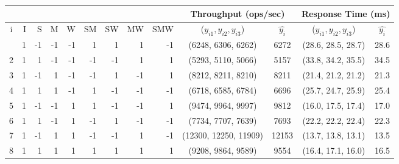 \begin{tabular}{|c|rrrrrrrr|c|c|c|c|}
       \cline{10-13}
       \multicolumn{9}{c}{} & \multicolumn{2}{|c}{\textbf{Throughput} (ops/sec)} & \multicolumn{2}{|c|}{\textbf{Response Time} (ms)}\TBstrut\\
       \hline
       i & \hphantom{-}I\hphantom{-} & \hphantom{-}S\hphantom{-} & \hphantom{-}M\hphantom{-} &\hphantom{-}W\hphantom{-} & SM & SW & MW & SMW & ($y_{i1}, y_{i2}, y_{i3}$) & $\hat{y_i}$  & ($y_{i1}, y_{i2}, y_{i3}$) & $\hat{y_i}$\TBstrut\\
       \hline
   \Tstrut 1 & 1\hphantom{-} & -1\hphantom{-} & -1\hphantom{-} & -1\hphantom{--} & 1\hphantom{--} & 1\hphantom{--} & 1\hphantom{--} & -1\hphantom{---} & (6248, 6306, 6262) & 6272 & (28.6, 28.5, 28.7) & 28.6 \\
   2 & 1\hphantom{-} & 1\hphantom{-} & -1\hphantom{-} & -1\hphantom{--} & -1\hphantom{--} & -1\hphantom{--} & 1\hphantom{--} & 1\hphantom{---} & (5293, 5110, 5066) & 5157 & (33.8, 34.2, 35.5) & 34.5 \\
   3 & 1\hphantom{-} & -1\hphantom{-} & 1\hphantom{-} & -1\hphantom{--} & -1\hphantom{--} & 1\hphantom{--} & -1\hphantom{--} & 1\hphantom{---} & (8212, 8211, 8210) & 8211 & (21.4, 21.2, 21.2) & 21.3 \\
   4 & 1\hphantom{-} & 1\hphantom{-} & 1\hphantom{-} & -1\hphantom{--} & 1\hphantom{--} & -1\hphantom{--} & -1\hphantom{--} & -1\hphantom{---} & (6718, 6585, 6784) & 6696 & (25.7, 24.7, 25.9) & 25.4 \\
   5 & 1\hphantom{-} & -1\hphantom{-} & -1\hphantom{-} & 1\hphantom{--} & 1\hphantom{--} & -1\hphantom{--} & -1\hphantom{--} & 1\hphantom{---} & (9474, 9964, 9997) & 9812 & (16.0, 17.5, 17.4) & 17.0 \\
   6 & 1\hphantom{-} & 1\hphantom{-} & -1\hphantom{-} & 1\hphantom{--} & -1\hphantom{--} & 1\hphantom{--} & -1\hphantom{--} & -1\hphantom{---} & (7734, 7707, 7639) & 7693 & (22.2, 22.2, 22.4) & 22.3 \\
   7 & 1\hphantom{-} & -1\hphantom{-} & 1\hphantom{-} & 1\hphantom{--} & -1\hphantom{--} & -1\hphantom{--} & 1\hphantom{--} & -1\hphantom{---} & (12300, 12250, 11909) & 12153 & (13.7, 13.8, 13.1) & 13.5 \\
   8 & 1\hphantom{-} & 1\hphantom{-} & 1\hphantom{-} & 1\hphantom{--} & 1\hphantom{--} & 1\hphantom{--} & 1\hphantom{--} & 1\hphantom{---} & (9208, 9864, 9589) & 9554 & (16.4, 17.1, 16.0) & 16.5 \\
   \hline
    \end{tabular}